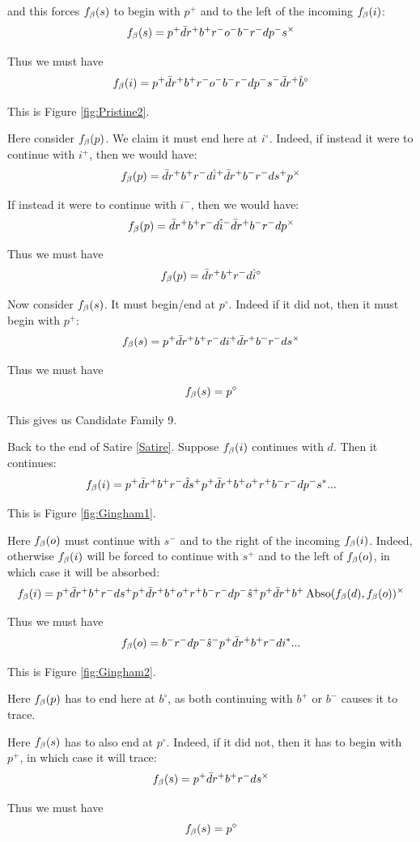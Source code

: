 and this forces $f_\beta(s)$ to begin with $p^+$ and to the left of the incoming $f_\beta(i)$:
\[
f_\beta(s) = p^+ \bar{d} r^+ b^+ r^- o^- b^- r^- d p^- s^\times
\]

Thus we must have
\[
f_\beta(i) = p^+ \bar{d} r^+ b^+ r^- o^- b^- r^- d p^- s^- \bar{d} r^+ \hat{b}^\circ
\]

This is Figure \ref{fig:Pristine2}.

Here consider $f_\beta(p)$. We claim it must end here at $i^\circ$. Indeed, if instead it were to continue with $i^+$, then we would have:
\[
f_\beta(p) = \bar{d} r^+ b^+ r^- d \hat{i}^+ \bar{d} r^+ b^- r^- d s^+ p^\times
\]

If instead it were to continue with $i^-$, then we would have:
\[
f_\beta(p) = \bar{d} r^+ b^+ r^- d \hat{i}^- \bar{d} r^+ b^- r^- d p^\times
\]

Thus we must have
\[
f_\beta(p) = \bar{d} r^+ b^+ r^- d \hat{i}^\circ
\]

Now consider $f_\beta(s)$. It must begin/end at $p^\circ$. Indeed if it did not, then it must begin with $p^+$:
\[
f_\beta(s) = p^+ \bar{d} r^+ b^+ r^- d i^+ \bar{d} r^+ b^- r^- d s^\times
\]

Thus we must have
\[
f_\beta(s) = p^\circ
\]

This gives us Candidate Family 9.

\label{Gingham}
Back to the end of Satire \ref{Satire}. Suppose $f_\beta(i)$ continues with $d$. Then it continues:
\[
f_\beta(i) = p^+ \bar{d} r^+ b^+ r^- \hat{d} s^+ p^+ \bar{d} r^+ b^+ o^+ r^+ b^- r^- d p^- s^*...
\]

This is Figure \ref{fig:Gingham1}.

Here $f_\beta(o)$ must continue with $s^-$ and to the right of the incoming $f_\beta(i)$. Indeed, otherwise $f_\beta(i)$ will be forced to continue with $s^+$ and to the left of $f_\beta(o)$, in which case it will be absorbed:
\[
f_\beta(i) = p^+ \bar{d} r^+ b^+ r^- d s^+ p^+ \bar{d} r^+ b^+ o^+ r^+ b^- r^- d p^- \hat{s}^+ p^+ \bar{d} r^+ b^+ \operatorname{Abso}(f_\beta(d), f_\beta(o))^\times
\]

Thus we must have
\[
f_\beta(o) = b^- r^- d p^- \hat{s}^- p^+ \bar{d} r^+ b^+ r^- d i^*...
\]

This is Figure \ref{fig:Gingham2}.

Here $f_\beta(p)$ has to end here at $b^\circ$, as both continuing with $b^+$ or $b^-$ causes it to trace.

Here $f_\beta(s)$ has to also end at $p^\circ$. Indeed, if it did not, then it has to begin with $p^+$, in which case it will trace:
\[
f_\beta(s) = p^+ \bar{d} r^+ b^+ r^- d s^\times
\]

Thus we must have
\[
f_\beta(s) = p^\circ
\]

